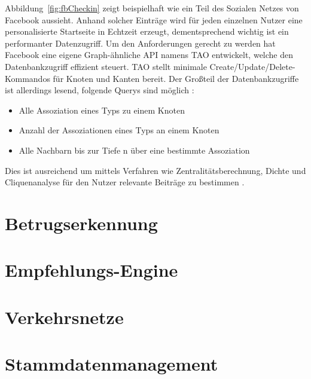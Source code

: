 Abbildung~\ref{fig:fbCheckin} zeigt beispielhaft wie ein Teil des Sozialen Netzes von Facebook aussieht. Anhand solcher Einträge wird für jeden einzelnen Nutzer eine personalisierte Startseite in Echtzeit erzeugt, dementsprechend wichtig ist ein performanter Datenzugriff. Um den Anforderungen gerecht zu werden hat Facebook eine eigene Graph-ähnliche API namens TAO entwickelt, welche den Datenbankzugriff effizient steuert. TAO stellt minimale Create/Update/Delete-Kommandos für Knoten und Kanten bereit. Der Großteil der Datenbankzugriffe ist allerdings lesend, folgende Querys sind möglich \cite{facebookTao}:
\begin{itemize}
	\item Alle Assoziation eines Typs zu einem Knoten
	\item Anzahl der Assoziationen eines Typs an einem Knoten
	\item Alle Nachbarn bis zur Tiefe n über eine bestimmte Assoziation
\end{itemize}
Dies ist ausreichend um mittels Verfahren wie Zentralitätsberechnung, Dichte und Cliquenanalyse für den Nutzer relevante Beiträge zu bestimmen \cite{sozialeNetzwerkanalyse}.

\section{Betrugserkennung}
\section{Empfehlungs-Engine}
\section{Verkehrsnetze}
\section{Stammdatenmanagement}
